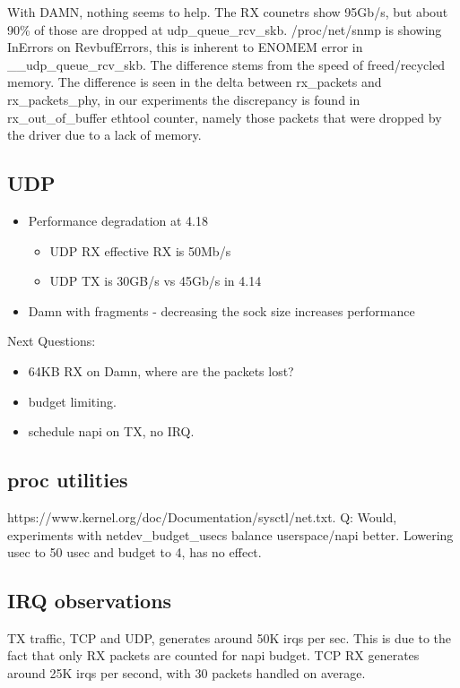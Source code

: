 With DAMN, nothing seems to help. The RX counetrs show 95Gb/s, but about 90\% of those are dropped at \newline udp\_queue\_rcv\_skb. /proc/net/snmp is showing InErrors on RevbufErrors, this is inherent to ENOMEM error in \newline \_\_udp\_queue\_rcv\_skb. The difference stems from the speed of freed/recycled memory. The difference is seen in the delta between rx\_packets and rx\_packets\_phy, in our experiments the discrepancy is found in rx\_out\_of\_buffer ethtool counter, namely those packets that were dropped by the driver due to a lack of memory.  
\subsection{UDP}
\begin{itemize}
    \item Performance degradation at 4.18
    \begin{itemize}
        \item UDP RX effective RX is 50Mb/s
        \item UDP TX is 30GB/s vs 45Gb/s in 4.14
    \end{itemize}
    \item Damn with fragments - decreasing the sock size increases performance
    
\end{itemize}
Next Questions:
\begin{itemize}
    \item 64KB RX on Damn, where are the packets lost?
    \item budget limiting.
    \item schedule napi on TX, no IRQ.
\end{itemize}
\subsection{proc utilities}
https://www.kernel.org/doc/Documentation/sysctl/net.txt.
Q: Would, experiments with netdev\_budget\_usecs balance userspace/napi better.
Lowering usec to 50 usec and budget to 4, has no effect.
\subsection{IRQ observations}
TX traffic, TCP and UDP, generates around 50K irqs per sec. This is due to the fact that only RX packets are counted for napi budget. TCP RX generates around 25K irqs per second, with 30 packets handled on average.  
